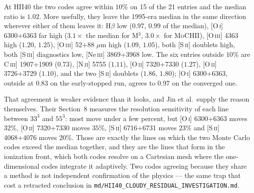 \documentclass[english,a4paper]{my_memo}
\newcommand{\code}[1]{\texttt{#1}}
\newcommand{\MoCHII}{\textsc{MoCHII}}
\newcommand{\Mthree}{M$^3$}
\begin{document}
\endgroup

At HII40 the two codes agree within $10\%$ on 15 of the 21 entries and the
median ratio is $1.02$.  More usefully, they leave the 1995-era median in
the same direction wherever either of them leaves it: H$\beta$ low ($0.97$,
$0.99$ of the median), [O\,\textsc{i}] 6300+6363 far high ($3.1\times$ the
median for \Mthree{}, $3.0\times$ for \MoCHII{}), [O\,\textsc{iii}] 4363
high ($1.20$, $1.25$), [O\,\textsc{iii}] 52+88 $\mu$m high ($1.09$,
$1.05$), both [S\,\textsc{ii}] doublets high, both [S\,\textsc{iii}]
diagnostics low, [Ne\,\textsc{iii}] 3869+3968 low.  The six entries outside
$10\%$ are C\,\textsc{iii}] 1907+1909 ($0.73$), [N\,\textsc{ii}] 5755
($1.11$), [O\,\textsc{ii}] 7320+7330 ($1.27$), [O\,\textsc{ii}] 3726+3729
($1.10$), and the two [S\,\textsc{ii}] doublets ($1.86$, $1.80$);
[O\,\textsc{i}] 6300+6363, outside at $0.83$ on the early-stopped run, agrees to
$0.97$ on the converged one.

That agreement is weaker evidence than it looks, and Jin et al.\ supply the
reason themselves.  Their Section~8 measures the resolution sensitivity of
each line between $33^3$ and $55^3$: most move under a few percent, but
[O\,\textsc{i}] 6300+6363 moves $32\%$, [O\,\textsc{ii}] 7320+7330 moves
$35\%$, [S\,\textsc{ii}] 6716+6731 moves $23\%$ and [S\,\textsc{ii}]
4068+4076 moves $20\%$.  Those are exactly the lines on which the two
Monte Carlo codes exceed the median together, and they are the lines that
form in the ionization front, which both codes resolve on a Cartesian mesh
where the one-dimensional codes integrate it adaptively.  Two codes
agreeing because they share a method is not independent confirmation of the
physics --- the same trap that cost a retracted conclusion in
\code{md/HII40\_CLOUDY\_RESIDUAL\_INVESTIGATION.md}.
\end{document}
